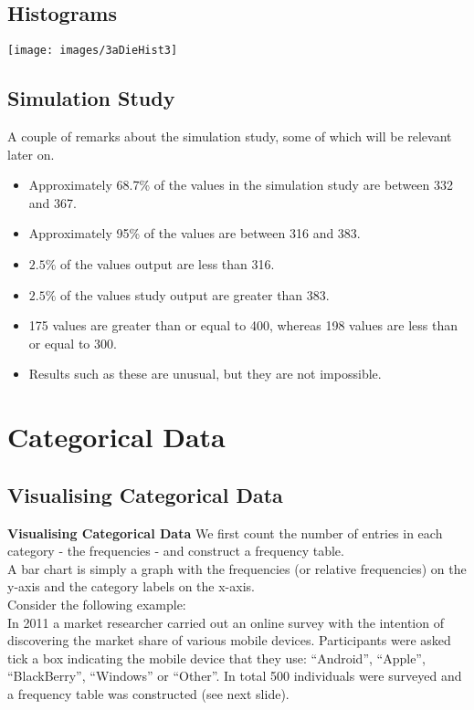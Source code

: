 \documentclass[]{report}
\begin{document}

{
\subsection{Histograms}

\begin{center}
\texttt{[image: images/3aDieHist3]}
\end{center}

}

{
\subsection{Simulation Study}
A couple of remarks about the simulation study, some of which will be relevant later on.
\begin{itemize}
\item Approximately 68.7\% of the values in the simulation study are between 332 and 367.
\item Approximately 95\% of the values are between 316 and 383.
\item $2.5\%$ of the values output are less than 316.
\item $2.5\%$ of the values study output are greater than 383.
\item 175 values are greater than or equal to 400, whereas 198 values are less than or equal to 300.
\item Results such as these are unusual, but they are not impossible.
\end{itemize}
}

\newpage


\section{Categorical Data}
\subsection{Visualising Categorical Data}
{ \textbf{Visualising Categorical Data}}
We first count the number of entries in each category - the frequencies - and construct a { frequency table}.\\[0.4cm]
A { bar chart} is simply a graph with the frequencies (or relative frequencies) on the y-axis and the category labels on the x-axis.\\[0.6cm]
Consider the following example:\\[0.2cm]
In 2011 a market researcher carried out an online survey with the intention of discovering the market share of various mobile devices. Participants were asked tick a box indicating the mobile device that they use: ``Android'', ``Apple'', ``BlackBerry'', ``Windows'' or ``Other''. In total 500 individuals were surveyed and a frequency table was constructed (see next slide).
\end{document}
